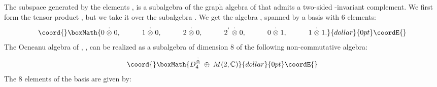 \documentclass[a4paper,11pt]{article}
\def \otimesdot {\stackrel{\cdot}{\otimes}}
\begin{document}
The subspace \coordHE{} generated by the elements \coordHE{}, is a
subalgebra of the graph algebra of \coordHE{} that admits a two-sided
\coordHE{}-invariant complement.
We first form the tensor product \coordHE{}, but we take it over
the subalgebra \coordHE{}.
We get the algebra \myHighlight{$D_4^{\otimesdot} = D_4 \otimesdot D_4 \doteq
D_4 \otimes_{J_3} D_4$}\coordHE{},
spanned by a basis with 6 elements:
$$\coord{}\boxMath{
0 \otimesdot 0, \qquad \quad 1 \otimesdot 0, \qquad \quad  2 \otimesdot 0,
\qquad \quad  2^{'} \otimesdot 0, \qquad \quad 0 \otimesdot 1, \qquad \quad
1 \otimesdot 1.
}{dollar}{0pt}\coordE{}$$
The Ocneanu algebra of \coordHE{}, \coordHE{}, can be realized as
a subalgebra of dimension 8 of the following non-commutative algebra:
$$\coord{}\boxMath{
D_4^{\otimesdot} \; \oplus \; M(2,\mathbb{C})
}{dollar}{0pt}\coordE{}$$
The 8 elements of the basis are given by:
\end{document}
